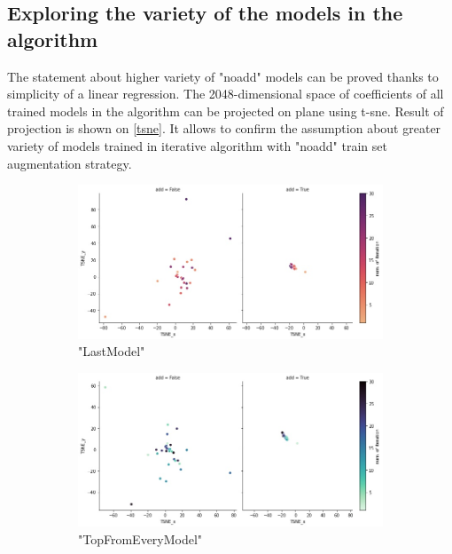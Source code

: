\subsection{Exploring the variety of the models in the algorithm}

The statement about higher variety of "noadd" models can be proved thanks to simplicity of a linear regression.
The 2048-dimensional space of coefficients of all trained models in the algorithm can be projected on plane using t-sne.
Result of projection is shown on \ref{tsne}. 
It allows to confirm the assumption about greater variety of models trained in iterative algorithm with "noadd" train set augmentation strategy.

\begin{figure}
\centering
\begin{subfigure}{\textwidth}
\centering
\includegraphics[scale = 0.50]{Images/LMtsne.jpg}
\caption{"LastModel"}
\end{subfigure}
\hfill\break
\begin{subfigure}{\textwidth}
\centering
\includegraphics[scale = 0.50]{Images/TPEVtsne.jpg}
\caption{"TopFromEveryModel"}
\end{subfigure}
\hfill\break
\begin{subfigure}{\textwidth}

\end{subfigure}
\end{figure}
